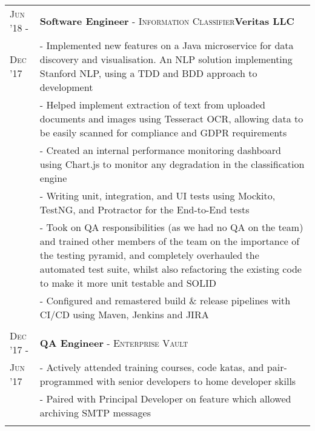 \documentclass[a4paper,10pt]{extarticle} %
\begin{document}
{\begin{tabularx}{\linewidth}{ l | X }
\textsc{Jun '18 -} & \textbf{Software Engineer} \textsc{ - Information Classifier}\hfill\textbf{Veritas LLC}\\
\textsc{Dec '17} & {\raggedright - Implemented new features on a Java microservice for data discovery and visualisation. An NLP solution implementing Stanford NLP, using a TDD and BDD approach to development}\\
& {- Helped implement extraction of text from uploaded documents and images using Tesseract OCR, allowing data to be easily scanned for compliance and GDPR requirements}\\
& {- Created an internal performance monitoring dashboard using Chart.js to monitor any degradation in the classification engine}\\
& {- Writing unit, integration, and UI tests using Mockito, TestNG, and Protractor for the End-to-End tests}\\
& {- Took on QA responsibilities (as we had no QA on the team) and trained other members of the team on the importance of the testing pyramid, and completely overhauled the automated test suite, whilst also refactoring the existing code to make it more unit testable and SOLID}\\
& {- Configured and remastered build \& release pipelines with CI/CD using Maven, Jenkins and JIRA}\\

\\


\textsc{Dec '17 -} & \textbf{QA Engineer} \textsc{ - Enterprise Vault}\hfill\\
\textsc{Jun '17} & {- Actively attended training courses, code katas, and pair-programmed with senior developers to home developer skills}\\
& {- Paired with Principal Developer on feature which allowed archiving SMTP messages}\\
\\


\end{tabularx}}
\end{document}
